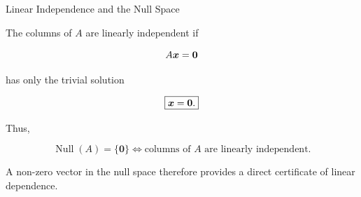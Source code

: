 
\begin{frame}{Linear Independence and the Null Space}

The columns of $A$ are linearly independent if

\[
A\bm{x}=\mathbf{0}
\]

has only the trivial solution

\[
\boxed{
\bm{x}=\mathbf{0}.
}
\]

Thus,

\[
\boxed{
\operatorname{Null}(A)=\{\mathbf{0}\}
\iff
\text{columns of }A\text{ are linearly independent}.
}
\]

\vspace{0.4cm}

A non-zero vector in the null space therefore provides
a direct certificate of linear dependence.

\end{frame}



